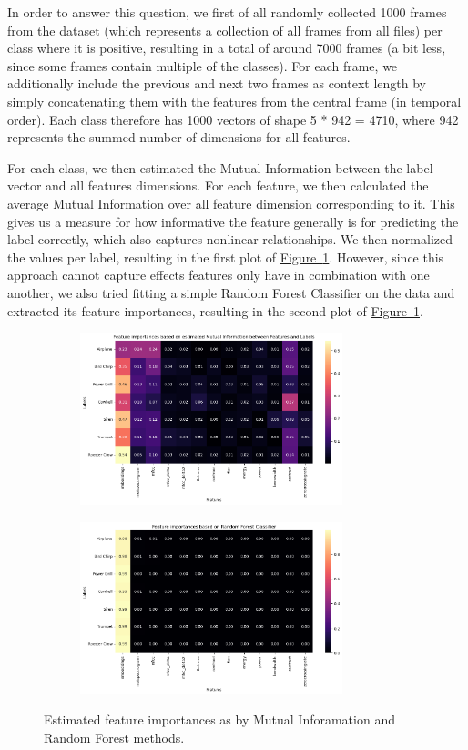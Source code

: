In order to answer this question, we first of all randomly collected 1000 frames from the dataset (which represents a collection of all frames from all files) per class where it is positive, resulting in a total of around 7000 frames (a bit less, since some frames contain multiple of the classes). For each frame, we additionally include the previous and next two frames as context length by simply concatenating them with the features from the central frame (in temporal order). Each class therefore has 1000 vectors of shape 5 * 942 = 4710, where 942 represents the summed number of dimensions for all features.

For each class, we then estimated the Mutual Information between the label vector and all features dimensions. For each feature, we then calculated the average Mutual Information over all feature dimension corresponding to it. This gives us a measure for how informative the feature generally is for predicting the label correctly, which also captures nonlinear relationships. We then normalized the values per label, resulting in the first plot of \hyperref[fig:1_FI]{Figure~\ref*{fig:1_FI}}. However, since this approach cannot capture effects features only have in combination with one another, we also tried fitting a simple Random Forest Classifier on the data and extracted its feature importances, resulting in the second plot of \hyperref[fig:1_FI]{Figure~\ref*{fig:1_FI}}.

\begin{figure}[htbp]
  \centering
  \begin{subfigure}[b]{0.49\textwidth}
    \includegraphics[width=\textwidth, height=5cm]{figs/1_MI.png}
  \end{subfigure}
  \hfill
  \begin{subfigure}[b]{0.49\textwidth}
    \includegraphics[width=\textwidth, height=5cm]{figs/1_RF.png}
  \end{subfigure}
  \caption{Estimated feature importances as by Mutual Inforamation and Random Forest methods.}
  \label{fig:1_FI}
\end{figure}

